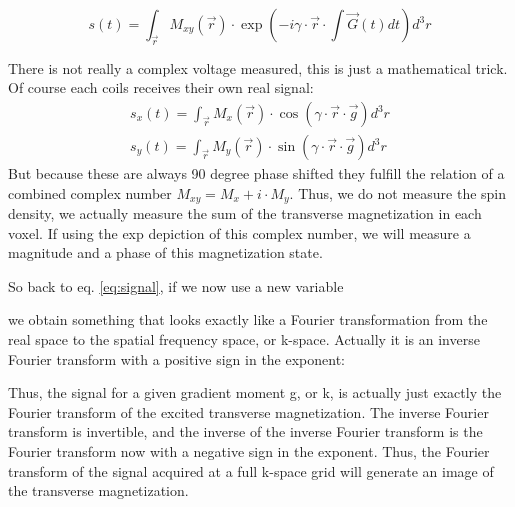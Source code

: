 \documentclass[a4paper,12pt]{extarticle}
\begin{document}
 \begin{equation} \label{eq:signal}
     s(t) = \int_{\vec{r}}M_{xy}(\vec{r})\cdot \exp\left(-i\gamma\cdot \vec{r}\cdot \int \vec{G}(t)dt\right) d^3r
 \end{equation}
 
There is not really a complex voltage measured, this is just a mathematical trick. Of course each coils receives their own real signal:   
\begin{align}
 s_x(t) = \int_{\vec{r}} M_{x}(\vec{r})\cdot \cos(\gamma\cdot\vec{r}\cdot \vec{g}) d^3r \\
 s_y(t) = \int_{\vec{r}} M_{y}(\vec{r})\cdot \sin(\gamma\cdot \vec{r}\cdot \vec{g}) d^3r 
 \end{align}
 But because these are always 90 degree phase shifted they fulfill the relation of a combined complex number $M_{xy}=M_x+i\cdot M_y$. Thus, we do not measure the spin density, we actually measure the sum of the transverse magnetization in each voxel. If using the exp depiction of this complex number, we will measure a magnitude and a phase of this magnetization state.
 
So back to eq. \eqref{eq:signal}, if we now use a new variable 

we obtain something that looks exactly like a Fourier transformation from the real space to the spatial frequency space, or k-space. Actually it is an inverse Fourier transform with a positive sign in the exponent:

Thus, the signal for a given gradient moment g, or k, is  actually just exactly the Fourier transform of the  excited transverse magnetization. 
 The inverse Fourier transform is invertible, and the inverse of the inverse Fourier transform is the Fourier transform now with a negative sign in the exponent.
 Thus, the Fourier transform of the signal acquired at a full k-space grid will generate an image of the transverse magnetization.
 
\end{document}

